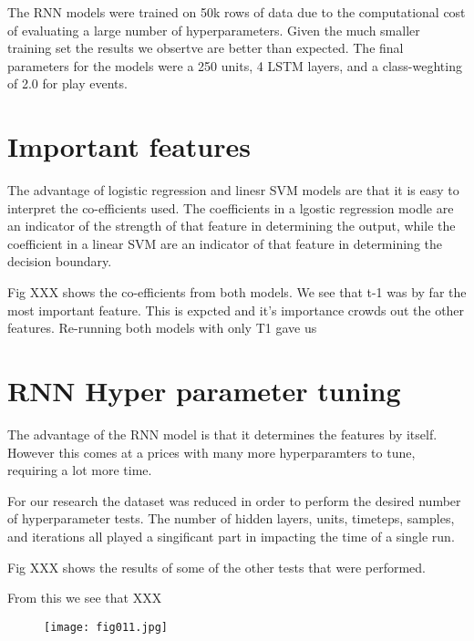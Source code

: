 The RNN models were trained on 50k rows of data due to the computational cost of evaluating a large number of hyperparameters. Given the much smaller training set the results we obsertve are better than expected.  The final parameters for the models were a 250 units, 4 LSTM layers, and a class-weghting of 2.0 for play events.

\section{Important features}
The advantage of logistic regression and linesr SVM models are that it is easy to interpret the co-efficients used. The coefficients in a lgostic regression modle are an indicator of the strength of that feature in determining the output, while the coefficient in a linear SVM are an indicator of that feature in determining the decision boundary.

Fig XXX shows the co-efficients from both models. We see that t-1 was by far the most important feature. This is expcted and it's importance crowds out the other features. Re-running both models with only T1 gave us 

\section{RNN Hyper parameter tuning}

The advantage of the RNN model is that it determines the features by itself. However this comes at a prices with many more hyperparamters to tune, requiring a lot more time.

For our research the dataset was reduced in order to perform the desired number of hyperparameter tests. The number of hidden layers, units, timeteps, samples, and iterations all played a singificant part in impacting the time of a single run. 

Fig XXX shows the results of some of the other tests that were performed.

From this we see that XXX

\begin{figure}[h!]
	\centering
	\texttt{[image: fig011.jpg]}
	\caption{}
	\label{fig:fig11}
\end{figure} 


